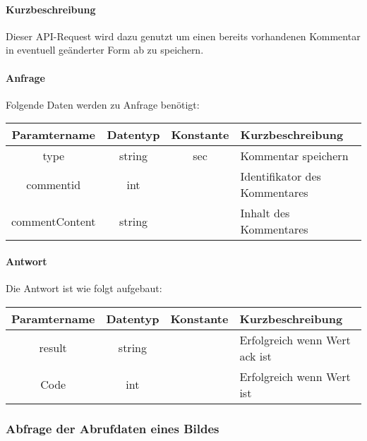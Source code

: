 \paragraph{Kurzbeschreibung}Dieser API-Request wird dazu genutzt um einen bereits vorhandenen Kommentar in eventuell geänderter Form ab zu speichern.
\paragraph{Anfrage}Folgende Daten werden zu Anfrage benötigt:
\begin{table}[H]
	\begin{tabular}{|c|c|c|p{6.5cm}|}
		\hline
		\textbf{Paramtername} & \textbf{Datentyp} & \textbf{Konstante} & \textbf{Kurzbeschreibung}                                                                                               \\ \hline
		type                & string            & sec                & Kommentar speichern \\ \hline
		commentid           & int               &                    & Identifikator des Kommentares \\ \hline
		commentContent      & string            &                    & Inhalt des Kommentares \\ \hline
	\end{tabular}
\end{table}
\paragraph{Antwort}Die Antwort ist wie folgt aufgebaut:
\begin{table}[H]
	\begin{tabular}{|c|c|c|p{6.5cm}|}
		\hline
		\textbf{Paramtername} & \textbf{Datentyp} & \textbf{Konstante} & \textbf{Kurzbeschreibung}                                                                                               \\ \hline
		result              & string           &                 & Erfolgreich wenn Wert {\glqq ack\grqq} ist \\ \hline
		Code                & int              &                 & Erfolgreich wenn Wert {\glqq 0\grqq} ist \\ \hline
	\end{tabular}
\end{table}
\subsubsection{Abfrage der Abrufdaten eines Bildes}
